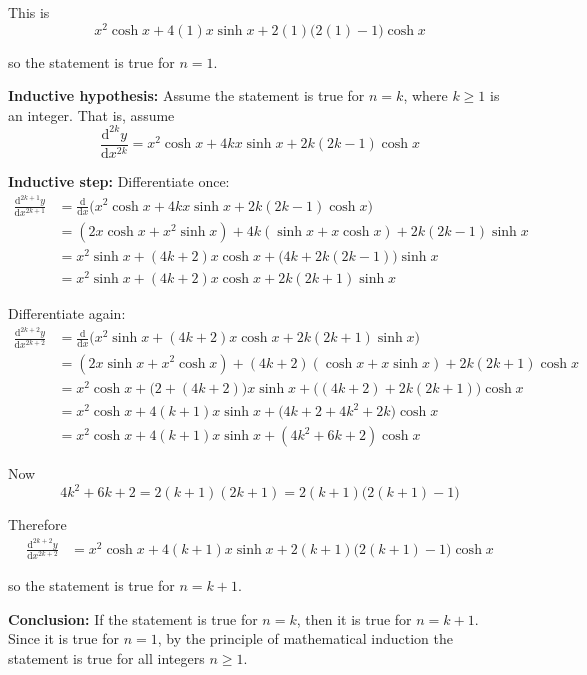 \documentclass[leqno]{article}
\begin{document}
\begin{enumerate}[
  label=\textbf{\arabic*.},
  leftmargin=*,
  topsep=0pt,
  partopsep=0pt,
  parsep=0pt
]
\begin{djsSolution}
This is
\[
x^2\cosh x+4(1)x\sinh x+2(1)\bigl(2(1)-1\bigr)\cosh x
\]

so the statement is true for \(n=1\).

\textbf{Inductive hypothesis:} Assume the statement is true for \(n=k\), where \(k\ge 1\) is an integer. That is, assume
\[
\frac{\mathrm{d}^{2k}y}{\mathrm{d}x^{2k}}=x^2\cosh x+4kx\sinh x+2k(2k-1)\cosh x
\]

\textbf{Inductive step:} Differentiate once:
\begin{align*}
\frac{\mathrm{d}^{2k+1}y}{\mathrm{d}x^{2k+1}}
&=\frac{\mathrm{d}}{\mathrm{d}x}\bigl(x^2\cosh x+4kx\sinh x+2k(2k-1)\cosh x\bigr)\\
&=(2x\cosh x+x^2\sinh x)+4k(\sinh x+x\cosh x)+2k(2k-1)\sinh x\\
&=x^2\sinh x+(4k+2)x\cosh x+\bigl(4k+2k(2k-1)\bigr)\sinh x\\
&=x^2\sinh x+(4k+2)x\cosh x+2k(2k+1)\sinh x
\end{align*}

Differentiate again:
\begin{align*}
\frac{\mathrm{d}^{2k+2}y}{\mathrm{d}x^{2k+2}}
&=\frac{\mathrm{d}}{\mathrm{d}x}\bigl(x^2\sinh x+(4k+2)x\cosh x+2k(2k+1)\sinh x\bigr)\\
&=(2x\sinh x+x^2\cosh x)+(4k+2)(\cosh x+x\sinh x)+2k(2k+1)\cosh x\\
&=x^2\cosh x+\bigl(2+(4k+2)\bigr)x\sinh x+\bigl((4k+2)+2k(2k+1)\bigr)\cosh x\\
&=x^2\cosh x+4(k+1)x\sinh x+\bigl(4k+2+4k^2+2k\bigr)\cosh x\\
&=x^2\cosh x+4(k+1)x\sinh x+(4k^2+6k+2)\cosh x
\end{align*}

Now
\[
4k^2+6k+2=2(k+1)(2k+1)=2(k+1)\bigl(2(k+1)-1\bigr)
\]

Therefore
\begin{align*}
\frac{\mathrm{d}^{2k+2}y}{\mathrm{d}x^{2k+2}}
&=x^2\cosh x+4(k+1)x\sinh x+2(k+1)\bigl(2(k+1)-1\bigr)\cosh x
\end{align*}

so the statement is true for \(n=k+1\).

\textbf{Conclusion:} If the statement is true for \(n=k\), then it is true for \(n=k+1\). Since it is true for \(n=1\), by the principle of mathematical induction the statement is true for all integers \(n\ge 1\).
\end{djsSolution}


\newpage

\questionitem


\end{enumerate}
\end{document}
